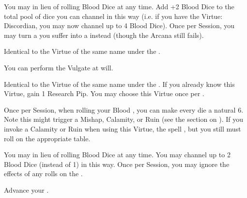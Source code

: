 \begin{multicols*}{2}



You may  in lieu of rolling Blood Dice at any time. Add +2 Blood Dice to the total pool of dice you can channel in this way (i.e. if you have the Virtue: Discordian, you may now channel up to 4 Blood Dice). Once per Session, you may turn a  you suffer into a  instead (though the Arcana still fails).


Identical to the Virtue of the same name under the .


You can perform the  Vulgate at will.


Identical to the Virtue of the same name under the . If you already know this Virtue, gain 1 Research Pip. You may choose this Virtue once per \LVL.


\newpage


Once per Session, when rolling your Blood \POOL, you can make every die a natural 6.  Note this might trigger a Mishap, Calamity, or Ruin (see the section on ).  If you invoke a Calamity or Ruin when using this Virtue, the spell , but you still must roll on the appropriate table.


   You may  in lieu of rolling Blood Dice at any time. You may channel up to 2 Blood Dice (instead of 1) in this way. Once per Session, you may ignore the effects of any rolls on the .



Advance your  \DCUP. 



\end{multicols*}
